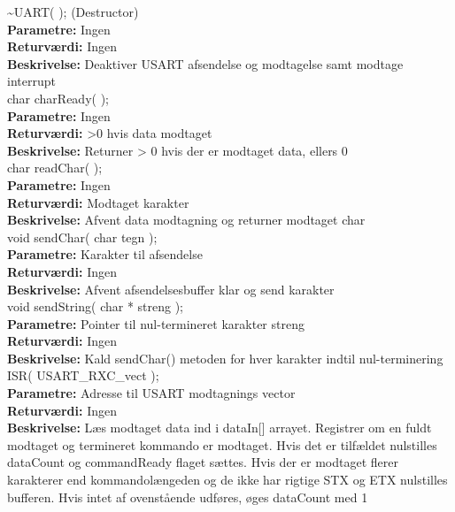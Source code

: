 \textasciitilde UART( ); (Destructor) \\
\textbf{Parametre:} Ingen \\
\textbf{Returværdi:} Ingen \\
\textbf{Beskrivelse:} Deaktiver USART afsendelse og modtagelse samt modtage interrupt \\

char charReady( ); \\
\textbf{Parametre:} Ingen \\
\textbf{Returværdi:} >0 hvis data modtaget \\
\textbf{Beskrivelse:} Returner > 0 hvis der er modtaget data, ellers 0 \\

char readChar( ); \\
\textbf{Parametre:} Ingen \\
\textbf{Returværdi:} Modtaget karakter \\
\textbf{Beskrivelse:} Afvent data modtagning og returner modtaget char \\

void sendChar( char tegn ); \\
\textbf{Parametre:} Karakter til afsendelse \\
\textbf{Returværdi:} Ingen \\
\textbf{Beskrivelse:} Afvent afsendelsesbuffer klar og send karakter \\

void sendString( char * streng ); \\
\textbf{Parametre:} Pointer til nul-termineret karakter streng \\
\textbf{Returværdi:} Ingen \\
\textbf{Beskrivelse:} Kald sendChar() metoden for hver karakter indtil nul-terminering \\

ISR( USART\_RXC\_vect ); \\
\textbf{Parametre:} Adresse til USART modtagnings vector \\
\textbf{Returværdi:} Ingen \\
\textbf{Beskrivelse:} Læs modtaget data ind i dataIn[] arrayet. Registrer om en fuldt modtaget og termineret kommando er modtaget. Hvis det er tilfældet nulstilles dataCount og commandReady flaget sættes. Hvis der er modtaget flerer karakterer end kommandolængeden og de ikke har rigtige STX og ETX nulstilles bufferen. Hvis intet af ovenstående udføres, øges dataCount med 1\\

